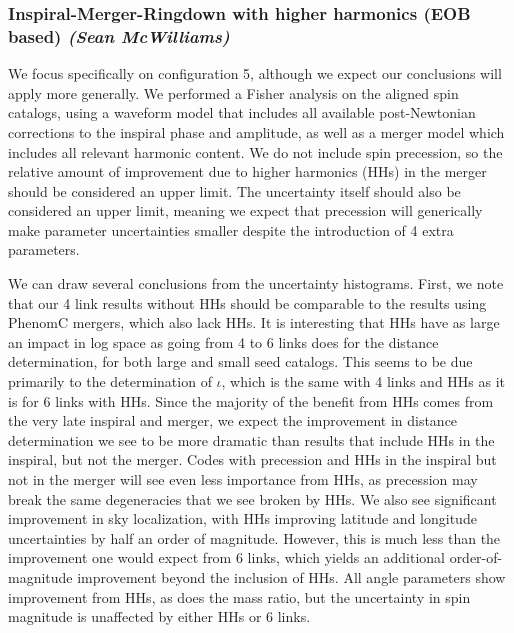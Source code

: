\documentclass{iopart}
\begin{document}
\subsubsection{Inspiral-Merger-Ringdown with higher harmonics (EOB based)  {\it (Sean McWilliams)}}
\label{SSS:MBHbPEGSFC}

We focus specifically on configuration 5, although we expect our
conclusions will apply more generally.  We performed a Fisher analysis on the aligned spin catalogs, using
a waveform model that includes all available post-Newtonian corrections to the inspiral phase and amplitude, as well as a merger model which
includes all relevant harmonic content.  We do not include spin precession, so the relative amount of improvement due to higher harmonics (HHs) in the merger
should be considered an upper limit.  The uncertainty itself should also be considered an upper limit, meaning we expect that precession
will generically make parameter uncertainties smaller despite the introduction of 4 extra parameters.

We can draw several conclusions from the uncertainty histograms.  First, we note that our 4 link results without HHs should be
comparable to the results using PhenomC mergers, which also lack HHs.  It is interesting that HHs have as large an impact in 
log space as going from 4 to 6 links does for the distance determination, for both large and small seed catalogs.  This seems to be due primarily to the 
determination of $\iota$, which is the same with 4 links and HHs as it is for 6 links with HHs.  Since the majority of the benefit from HHs comes from 
the very late inspiral and merger, we expect the improvement in distance determination we see to be more dramatic than results that include HHs in the
inspiral, but not the merger.  Codes with precession and HHs in the inspiral but not in the merger will see even less importance from HHs, as precession
may break the same degeneracies that we see broken by HHs.  We also see significant improvement in sky localization, with HHs improving latitude
and longitude uncertainties by half an order of magnitude.  However, this is much less than the improvement one would expect from 6 links, which
yields an additional order-of-magnitude improvement beyond the inclusion of HHs.  All angle parameters show improvement from HHs, as does the mass ratio,
but the uncertainty in spin magnitude is unaffected by either HHs or 6 links.
\end{document}
